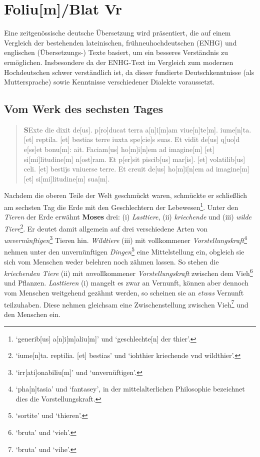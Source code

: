 \documentclass[
]{article}
\author{Dietmar Gerald Schrausser}
\date{09.05.2026}
\begin{document}
\hypertarget{foliumblat-vr}{%
\section{Foliu{[}m{]}/Blat Vr}\label{foliumblat-vr}}

Eine zeitgenössische deutsche Übersetzung wird präsentiert, die auf
einem Vergleich der bestehenden lateinischen, frühneuhochdeutschen
(ENHG) und englischen (Übersetzungs-) Texte basiert, um ein besseres
Verständnis zu ermöglichen. Insbesondere da der ENHG-Text im Vergleich
zum modernen Hochdeutschen schwer verständlich ist, da dieser fundierte
Deutschkenntnisse (als Muttersprache) sowie Kenntnisse verschiedener
Dialekte voraussetzt.

\hypertarget{vom-werk-des-sechsten-tages}{%
\subsection{Vom Werk des sechsten
Tages}\label{vom-werk-des-sechsten-tages}}

\begin{quote}
\textbf{S}Exte die dixit de{[}us{]}. p{[}ro{]}ducat terra
a{[}n{]}i{[}m{]}am viue{[}n{]}te{[}m{]}. iume{[}n{]}ta. {[}et{]}
reptila. {[}et{]} bestias terre iuxta spe{[}cie{]}s suas. Et vidit
de{[}us{]} q{[}uo{]}d e{[}ss{]}et bonu{[}m{]}: ait. Faciam{[}us{]}
ho{[}m{]}i{[}n{]}em ad imagine{[}m{]} {[}et{]} si{[}mi{]}litudine{[}m{]}
n{[}ost{]}ram. Et p{[}er{]}sit piscib{[}us{]} mar{[}is{]}. {[}et{]}
volatilib{[}us{]} celi. {[}et{]} bestijs vniuerse terre. Et creuit
de{[}us{]} ho{[}m{]}i{[}n{]}em ad imagine{[}m{]} {[}et{]}
si{[}mi{]}litudine{[}m{]} sua{[}m{]}.
\end{quote}

Nachdem die oberen Teile der Welt geschmückt waren, schmückte er
schließlich am sechsten Tag die Erde mit den Geschlechtern der
Lebewesen\footnote{`generib{[}us{]} a{[}n{]}i{[}m{]}aliu{[}m{]}' und
  `geschlechte{[}n{]} der thier'.}. Unter den \emph{Tieren} der Erde
erwähnt \textbf{Moses} drei: (i) \emph{Lasttiere}, (ii)
\emph{kriechende} und (iii) \emph{wilde Tiere}\footnote{`iume{[}n{]}ta.
  reptilia. {[}et{]} bestias' und `iohthier kriechende vnd wildthier'.}.
Er deutet damit allgemein auf drei verschiedene Arten von
\emph{unvernünftigen}\footnote{`irr{[}ati{]}onabiliu{[}m{]}' und
  `unvernüftigen'.} Tieren hin. \emph{Wildtiere} (iii) mit vollkommener
\emph{Vorstellungskraft}\footnote{`pha{[}n{]}tasia' und `fantasey', in
  der mittelalterlichen Philosophie bezeichnet dies die
  Vorstellungskraft.} nehmen unter den unvernünftigen
\emph{Dingen}\footnote{`sortite' und `thieren'.} eine Mittelstellung
ein, obgleich sie sich vom Menschen weder belehren noch zähmen lassen.
So stehen die \emph{kriechenden Tiere} (ii) mit \emph{un}vollkommener
\emph{Vorstellungskraft} zwischen dem Vieh\footnote{`bruta' und `vieh'.}
und Pflanzen. \emph{Lasttieren} (i) mangelt es zwar an Vernunft, können
aber dennoch vom Menschen weitgehend gezähmt werden, so scheinen sie an
\emph{etwas} Vernunft teilzuhaben. Diese nehmen gleichsam eine
Zwischenstellung zwischen Vieh\footnote{`bruta' und `vihe'.} und den
Menschen ein.
\end{document}
